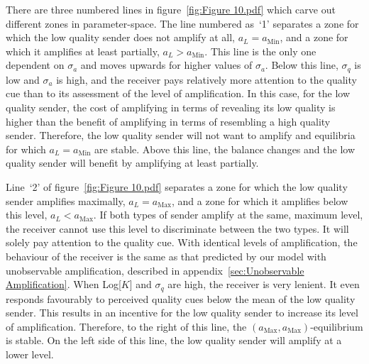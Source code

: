 \documentclass[a4paper,12pt]{article}
\numberwithin{equation}{section}
\numberwithin{figure}{section}
\begin{document}
\enlargethispage{3mm}

There are three numbered lines in figure~\ref{fig:Figure 10.pdf} which carve out different zones in parameter-space. The line numbered as~`1' separates a zone for which the low quality sender does not amplify at all, $a_{L}=a_{\text{Min}}$, and a zone for which it amplifies at least partially, $a_{L}>a_{\text{Min}}$. This line is the only one dependent on $\sigma_{a}$ and moves upwards for higher values of $\sigma_{a}$. Below this line, $\sigma_{q}$ is low and $\sigma_{a}$ is high, and the receiver pays relatively more attention to the quality cue than to its assessment of the level of amplification. In this case, for the low quality sender, the cost of amplifying in terms of revealing its low quality is higher than the benefit of amplifying in terms of resembling a high quality sender. Therefore, the low quality sender will not want to amplify and equilibria for which $a_{L}=a_{\text{Min}}$ are stable. Above this line, the balance changes and the low quality sender will benefit by amplifying at least partially.

Line~`2' of figure~\ref{fig:Figure 10.pdf} separates a zone for which the low quality sender amplifies maximally, $a_{L}=a_{\text{Max}}$, and a zone for which it amplifies below this level, $a_{L}<a_{\text{Max}}$. If both types of sender amplify at the same, maximum level, the receiver cannot use this level to discriminate between the two types. It will solely pay attention to the quality cue. With identical levels of amplification, the behaviour of the receiver is the same as that predicted by our model with unobservable amplification, described in appendix~\ref{sec:Unobservable Amplification}. When Log[$K$] and $\sigma_{q}$ are high, the receiver is very lenient. It even responds favourably to perceived quality cues below the mean of the low quality sender. This results in an incentive for the low quality sender to increase its level of amplification. Therefore, to the right of this line, the $(a_{\text{Max}},a_{\text{Max}})$-equilibrium is stable. On the left side of this line, the low quality sender will amplify at a lower level.
\end{document}
